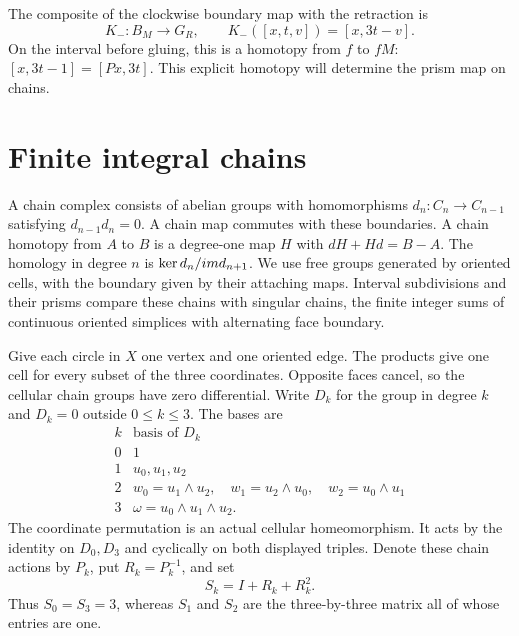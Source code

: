 The composite of the clockwise boundary map with the retraction is
\begin{equation}\label{marked-local:eq:actual-prism}
 K_-:B_M\longrightarrow G_R,
 \qquad K_-([x,t,v])=[x,3t-v].
\end{equation}
On the interval before gluing, this is a homotopy from $f$ to $fM$:
$[x,3t-1]=[Px,3t]$. This explicit homotopy will determine the
prism map on chains.

\section{Finite integral chains}

A chain complex consists of abelian groups with homomorphisms
$d_n:C_n\to C_{n-1}$ satisfying $d_{n-1}d_n=0$. A chain map
commutes with these boundaries. A chain homotopy from $A$ to $B$
is a degree-one map $H$ with $dH+Hd=B-A$.
The homology in degree $n$ is $\ker d_n/im d_{n+1}$.
We use free groups generated by oriented cells, with the boundary
given by their attaching maps. Interval subdivisions and their prisms
compare these chains with singular chains, the finite integer sums
of continuous oriented simplices with alternating face boundary.

Give each circle in $X$ one vertex and one oriented edge. The products
give one cell for every subset of the three coordinates. Opposite
faces cancel, so the cellular chain groups have zero differential.
Write $D_k$ for the group in degree $k$ and $D_k=0$ outside $0\le k\le3$.
The bases are
\begin{equation}\label{marked-local:eq:cell-bases}
 \begin{array}{c|c}
 k&\text{basis of }D_k\\ \hline
 0&1\\
 1&u_0,u_1,u_2\\
 2&w_0=u_1\wedge u_2,
     \quad w_1=u_2\wedge u_0,
     \quad w_2=u_0\wedge u_1\\
 3&\omega=u_0\wedge u_1\wedge u_2.
 \end{array}
\end{equation}
The coordinate permutation is an actual cellular homeomorphism. It acts
by the identity on $D_0,D_3$ and cyclically on both displayed triples.
Denote these chain actions by $P_k$, put $R_k=P_k^{-1}$, and set
\begin{equation}\label{marked-local:eq:norm}
                 S_k=I+R_k+R_k^2.
\end{equation}
Thus $S_0=S_3=3$, whereas $S_1$ and $S_2$ are the three-by-three
matrix all of whose entries are one.

